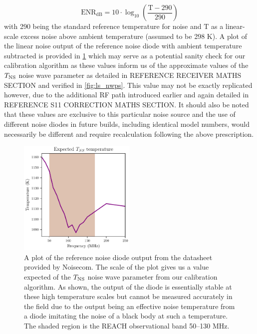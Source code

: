 \begin{equation}
    \mathrm{ENR_{dB}} = 10 \cdot \log_{10} \left( \frac{\mathrm{T} - 290}{290}\right)
\end{equation}
with 290 being the standard reference temperature for noise and $\mathrm{T}$ as a linear-scale excess noise above ambient temperature (assumed to be 298 K). A plot of the linear noise output of the reference noise diode with ambient temperature subtracted is provided in \cref{fig:ns_diode} which may serve as a potential sanity check for our calibration algorithm as these values inform us of the approximate values of the $T_{\mathrm{NS}}$ noise wave parameter as detailed in REFERENCE RECEIVER MATHS SECTION and verified in \cref{fig:ls_nwps}. This value may not be exactly replicated however, due to the additional RF path introduced earlier and again detailed in REFERENCE S11 CORRECTION MATHS SECTION. It should also be noted that these values are exclusive to this particular noise source and the use of different noise diodes in future builds, including identical model numbers, would necessarily be different and require recalculation following the above prescription.
\begin{figure}
    \centering
    \includegraphics[width=0.5\textwidth]{ns_diode}
    \caption{A plot of the reference noise diode output from the datasheet provided by Noisecom. The scale of the plot gives us a value expected of the $T_{\mathrm{NS}}$ noise wave parameter from our calibration algorithm. As shown, the output of the diode is essentially stable at these high temperature scales but cannot be measured accurately in the field due to the output being an effective noise temperature from a diode imitating the noise of a black body at such a temperature. The shaded region is the REACH observational band 50--130 MHz.}
    \label{fig:ns_diode}
\end{figure}


